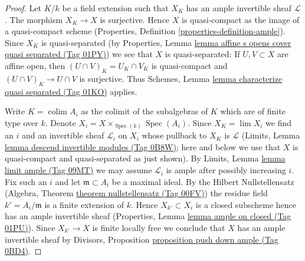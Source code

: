 \documentclass{amsart}
\theoremstyle{plain}
\theoremstyle{definition}
\theoremstyle{remark}
\numberwithin{equation}{subsection}
\def\lim{\mathop{\mathrm{lim}}\nolimits}
\def\colim{\mathop{\mathrm{colim}}\nolimits}
\def\Spec{\mathop{\mathrm{Spec}}}
\begin{document}
\begin{proof}
Let $K/k$ be a field extension such that $X_K$ has
an ample invertible sheaf $\mathcal{L}$.
The morphism $X_K \to X$ is surjective. Hence $X$ is quasi-compact
as the image of a quasi-compact scheme (Properties, Definition
\ref{properties-definition-ample}). Since $X_K$ is quasi-separated
(by Properties, Lemma
\href{https://stacks.math.columbia.edu/tag/01PY}{lemma affine s opens cover quasi separated (Tag 01PY)})
we see that $X$ is quasi-separated: If $U, V \subset X$ are
affine open, then $(U \cap V)_K = U_K \cap V_K$ is quasi-compact
and $(U \cap V)_K \to U \cap V$ is surjective. Thus
Schemes, Lemma \href{https://stacks.math.columbia.edu/tag/01KO}{lemma characterize quasi separated (Tag 01KO)} applies.

\medskip\noindent
Write $K = \colim A_i$ as the colimit of the subalgebras of $K$
which are of finite type over $k$. Denote
$X_i = X \times_{\Spec(k)} \Spec(A_i)$.
Since $X_K = \lim X_i$ we find an $i$ and an invertible sheaf
$\mathcal{L}_i$ on $X_i$ whose pullback to $X_K$ is $\mathcal{L}$
(Limits, Lemma \href{https://stacks.math.columbia.edu/tag/0B8W}{lemma descend invertible modules (Tag 0B8W)};
here and below we use that $X$ is quasi-compact and quasi-separated as
just shown). By Limits, Lemma \href{https://stacks.math.columbia.edu/tag/09MT}{lemma limit ample (Tag 09MT)}
we may assume $\mathcal{L}_i$ is ample after possibly increasing $i$.
Fix such an $i$ and let $\mathfrak m \subset A_i$ be a maximal
ideal. By the Hilbert Nullstellensatz
(Algebra, Theorem \href{https://stacks.math.columbia.edu/tag/00FV}{theorem nullstellensatz (Tag 00FV)})
the residue field $k' = A_i/\mathfrak m$ is a finite
extension of $k$. Hence $X_{k'} \subset X_i$ is a closed subscheme
hence has an ample invertible sheaf
(Properties, Lemma \href{https://stacks.math.columbia.edu/tag/01PU}{lemma ample on closed (Tag 01PU)}).
Since $X_{k'} \to X$ is finite locally free we conclude
that $X$ has an ample invertible sheaf by
Divisors, Proposition \href{https://stacks.math.columbia.edu/tag/0BD4}{proposition push down ample (Tag 0BD4)}.
\end{proof}
\end{document}
